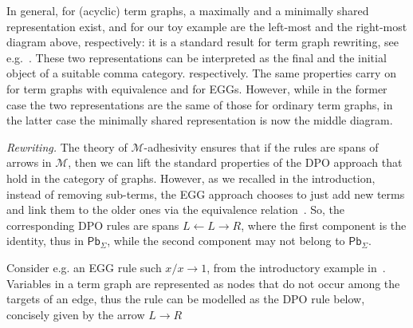\documentclass[a4paper,UKenglish,cleveref,pdftex,amsthm,thm-restate,numberwithinsect]{cas-sc}
\newcommand{\pbc}{\mathsf{Pb}}
\theoremstyle{plain}
\theoremstyle{definition}
\newcommand{\eg}[0]{\mathbf{EGG}}
\newcommand{\catname}[1]{\textbf{\textup{#1}}}
\newcommand{\GEqTGs}{\catname{GEqTG}_{\Sigma}}
\newcommand{\tg}[0]{\catname{TG}_{\Sigma}}
\begin{document}
In general, for (acyclic) term graphs, a maximally and a minimally shared representation
exist, and for our toy example are the left-most and the right-most diagram above, respectively:
it is a standard result for term graph rewriting, see e.g.~\cite{AriolaKP00}. 
These two representations can be interpreted as the final and the initial object of a suitable comma category.
respectively.
%
The same properties carry on 
%
for term graphs with equivalence and for EGGs. However, while in the former case the
two representations are the same of those for ordinary term graphs, in the latter case
the minimally shared representation is now the middle diagram.
%

\emph{Rewriting.} The theory of $\mathcal{M}$-adhesivity ensures that if the rules are spans of 
arrows in $\mathcal{M}$, then we can lift the standard properties
of the DPO approach that hold in the category of graphs.
However, as we recalled in the introduction, instead of removing sub-terms, the EGG approach 
chooses to
just add new terms and link them to the older ones via the equivalence relation~\cite{DetlefsNS05}.
So, the corresponding DPO rules 
are spans $L \leftarrow L \rightarrow R$, where the first component is the identity, thus in $\pbc_\Sigma$,
while the second component may not belong to $\pbc_\Sigma$. 

Consider e.g. an EGG rule such $x / x \to 1$, from the introductory example in~\cite{WillseyNWFTP21}.
Variables in a term graph are represented as nodes that do not occur among the targets of an edge, 
thus the rule can be modelled as the DPO rule below, concisely given by the arrow $L \rightarrow R$
\end{document}
